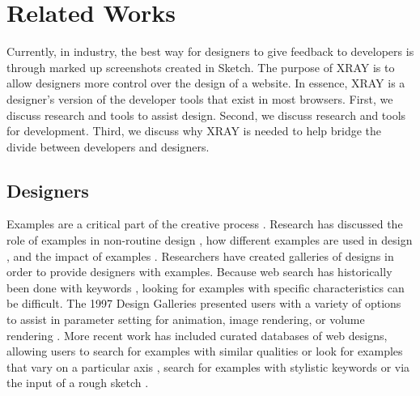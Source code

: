 \documentclass{sigchi}
\newcommand{\xray}{XRAY\xspace}
\begin{document}
\section{Related Works}
Currently, in industry, the best way for designers to give feedback to developers is through marked up screenshots created in Sketch. The purpose of \xray is to allow designers more control over the design of a website. In essence, \xray is a designer's version of the developer tools that exist in most browsers. First, we discuss research and tools to assist design. Second, we discuss research and tools for development. Third, we discuss why \xray is needed to help bridge the divide between developers and designers.  

\subsection{Designers}
Examples are a critical part of the creative process \cite{getting_inspired_designs_in_creativity_Herring_CHI_2009}. Research has discussed the role of examples in non-routine design \cite{creativity_in_design_activities_Bonnardel_CandC_1999}, how different examples are used in design \cite{getting_inspired_designs_in_creativity_Herring_CHI_2009}, and the impact of examples \cite{effects_of_examples_on_design_activities_Purcell_1992_kbc}. Researchers have created galleries of designs in order to provide designers with examples. Because web search has historically been done with keywords \cite{cueflik_interactive_concept_leraning_Fogarty_CHI_2008}, looking for examples with specific characteristics can be difficult. The 1997 Design Galleries presented users with a variety of options to assist in parameter setting for animation, image rendering, or volume rendering \cite{designGalleries_mitsubishi_Marks_SIGGRAPH_1997}. More recent work has included curated databases of web designs, allowing users to search for examples with similar qualities or look for examples that vary on a particular axis \cite{interactive_example_galleries_Lee_CHI_2010}, search for examples with stylistic keywords \cite{dtour_Ritchie_UIST_2011} or via the input of a rough sketch \cite{retrieving_websites_with_sketches_example_based_design_hashimoto_igarashi_EUROGRAPHICS_EWSBIM_2005}. 
\end{document}
